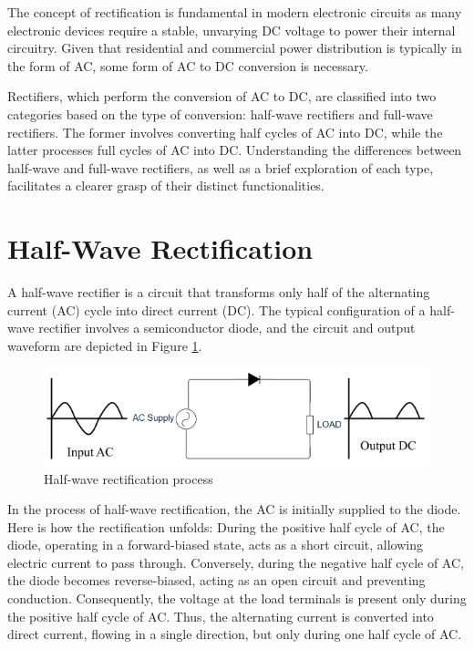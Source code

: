 \documentclass[12pt,a4paper]{book}
\begin{document}
The concept of rectification is fundamental in modern electronic circuits as many electronic devices require a stable, unvarying DC voltage to power their internal circuitry. Given that residential and commercial power distribution is typically in the form of AC, some form of AC to DC conversion is necessary.

Rectifiers, which perform the conversion of AC to DC, are classified into two categories based on the type of conversion: half-wave rectifiers and full-wave rectifiers. The former involves converting half cycles of AC into DC, while the latter processes full cycles of AC into DC. Understanding the differences between half-wave and full-wave rectifiers, as well as a brief exploration of each type, facilitates a clearer grasp of their distinct functionalities.

\section{Half-Wave Rectification}
A half-wave rectifier is a circuit that transforms only half of the alternating current (AC) cycle into direct current (DC). The typical configuration of a half-wave rectifier involves a semiconductor diode, and the circuit and output waveform are depicted in Figure \ref{fig:image1}.

\begin{figure}[h]
  \centering
  \includegraphics[width=13cm]{image1.png}
  \caption{Half-wave rectification process}
  \label{fig:image1}
\end{figure}

In the process of half-wave rectification, the AC is initially  supplied to the diode. Here is how the rectification unfolds: During the positive half cycle of AC, the diode, operating in a forward-biased state, acts as a short circuit, allowing electric current to pass through. Conversely, during the negative half cycle of AC, the diode becomes reverse-biased, acting as an open circuit and preventing conduction. Consequently, the voltage at the load terminals is present only during the positive half cycle of AC. Thus, the alternating current is converted into direct current, flowing in a single direction, but only during one half cycle of AC.
\end{document}
